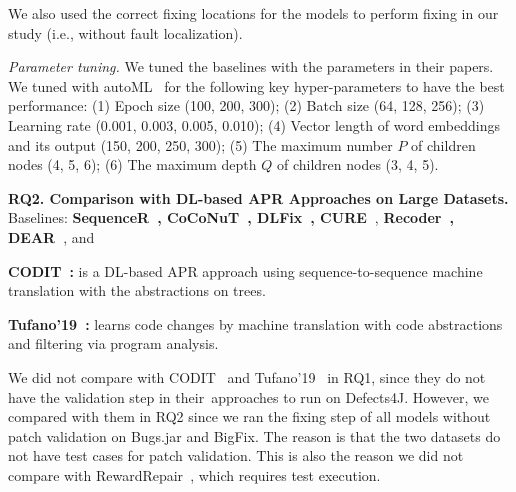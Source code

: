 We also used the correct fixing locations for the models to perform
fixing in our study (i.e., without fault localization).



{\em Parameter tuning.} We tuned the baselines with the
parameters in their papers.
We tuned {\tool} with autoML~\cite{NNI} for the following key
hyper-parameters to have the best performance: (1) Epoch size (100,
200, 300); (2) Batch size (64, 128, 256); (3) Learning rate (0.001,
0.003, 0.005, 0.010); (4) Vector length of word embeddings and its
output (150, 200, 250, 300); (5) The maximum number $P$ of children
nodes (4, 5, 6); (6) The maximum depth $Q$ of children nodes (3, 4,
5).

\vspace{2pt} {\bf RQ2. Comparison with DL-based APR Approaches on
  Large Datasets.} Baselines: {\bf
  Sequen\-ceR~\cite{chen2018sequencer},
  CoCoNuT~\cite{lutellier2020coconut}, DLFix~\cite{icse20},
  CURE~\cite{cure-icse21}}, {\bf Recoder~\cite{recoder-fse21},
  DEAR~\cite{icse22}}, and

{\bf CODIT~\cite{chakrabortycodit}:} is a DL-based APR approach
using sequence-to-sequence machine translation with the
abstractions on trees.

{\bf Tufano'19~\cite{tufano2019learning}:} learns code changes by
machine translation with code abstractions and
filtering via program analysis.

We did not compare with CODIT~\cite{chakrabortycodit} and
Tufano'19~\cite{tufano2019learning} in RQ1, since they do not have
the validation step in their~approaches to run on Defects4J.
%
However, we compared {\tool} with them in RQ2 since we ran the fixing
step of all models without patch validation on Bugs.jar and
BigFix. The reason is that the two datasets do not have test cases for
patch validation. This is also the reason we did not compare with
RewardRepair~\cite{monperrus-icse22}, which requires test execution.


